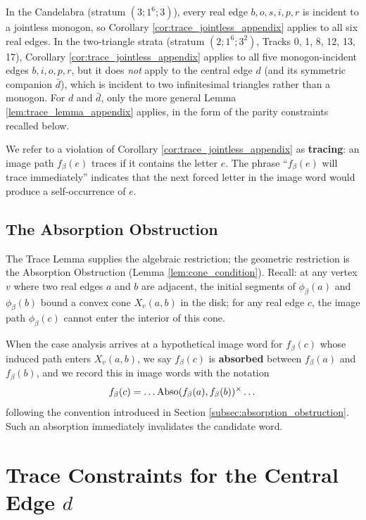 In the Candelabra (stratum $(3;1^6;3)$), every real edge $b, o, s, i, p, r$ is incident to a jointless monogon, so Corollary \ref{cor:trace_jointless_appendix} applies to all six real edges. In the two-triangle strata (stratum $(2;1^6;3^2)$, Tracks 0, 1, 8, 12, 13, 17), Corollary \ref{cor:trace_jointless_appendix} applies to all five monogon-incident edges $b, i, o, p, r$, but it does \emph{not} apply to the central edge $d$ (and its symmetric companion $\bar{d}$), which is incident to two infinitesimal triangles rather than a monogon. For $d$ and $\bar{d}$, only the more general Lemma \ref{lem:trace_lemma_appendix} applies, in the form of the parity constraints recalled below.

We refer to a violation of Corollary \ref{cor:trace_jointless_appendix} as \textbf{tracing}: an image path $f_\beta(e)$ traces if it contains the letter $e$. The phrase ``$f_\beta(e)$ will trace immediately'' indicates that the next forced letter in the image word would produce a self-occurrence of $e$.

\subsection{The Absorption Obstruction}
\label{sec:case_analysis_absorption}

The Trace Lemma supplies the algebraic restriction; the geometric restriction is the Absorption Obstruction (Lemma \ref{lem:cone_condition}). Recall: at any vertex $v$ where two real edges $a$ and $b$ are adjacent, the initial segments of $\phi_\beta(a)$ and $\phi_\beta(b)$ bound a convex cone $X_v(a, b)$ in the disk; for any real edge $c$, the image path $\phi_\beta(c)$ cannot enter the interior of this cone.

When the case analysis arrives at a hypothetical image word for $f_\beta(c)$ whose induced path enters $X_v(a, b)$, we say $f_\beta(c)$ is \textbf{absorbed} between $f_\beta(a)$ and $f_\beta(b)$, and we record this in image words with the notation
\[
f_\beta(c) = \dots \operatorname{Abso}(f_\beta(a), f_\beta(b))^\times \dots
\]
following the convention introduced in Section \ref{subsec:absorption_obstruction}. Such an absorption immediately invalidates the candidate word.

\section{Trace Constraints for the Central Edge $d$}
\label{sec:case_analysis_trace_constraints}

